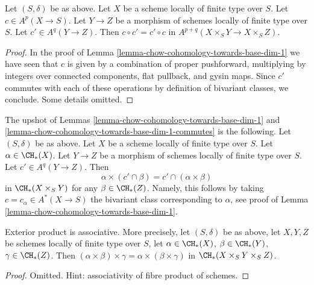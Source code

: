 \begin{lemma}
\label{lemma-chow-cohomology-towards-base-dim-1-commutes}
Let $(S, \delta)$ be as above. Let $X$ be a scheme locally of finite type
over $S$. Let $c \in A^p(X \to S)$. Let $Y \to Z$ be a morphism of schemes
locally of finite type over $S$. Let $c' \in A^q(Y \to Z)$. Then
$c \circ c' = c' \circ c$ in $A^{p + q}(X \times_S Y \to X \times_S Z)$.
\end{lemma}

\begin{proof}
In the proof of Lemma \ref{lemma-chow-cohomology-towards-base-dim-1}
we have seen that $c$ is given by a combination of
proper pushforward, multiplying by integers over connected
components, flat pullback, and gysin maps. Since $c'$ commutes with each of
these operations by definition of bivariant classes, we conclude.
Some details omitted.
\end{proof}

\begin{remark}
\label{remark-commuting-exterior-dim-1}
The upshot of Lemmas \ref{lemma-chow-cohomology-towards-base-dim-1}
and \ref{lemma-chow-cohomology-towards-base-dim-1-commutes} is the following.
Let $(S, \delta)$ be as above. Let $X$ be a scheme locally of finite type
over $S$.
Let $\alpha \in \CH_*(X)$. Let $Y \to Z$ be a morphism of schemes
locally of finite type over $S$. Let $c' \in A^q(Y \to Z)$. Then
$$
\alpha \times (c' \cap \beta) = c' \cap (\alpha \times \beta)
$$
in $\CH_*(X \times_S Y)$ for any $\beta \in \CH_*(Z)$. Namely, this
follows by taking $c = c_\alpha \in A^*(X \to S)$ the bivariant class
corresponding to $\alpha$, see proof of
Lemma \ref{lemma-chow-cohomology-towards-base-dim-1}.
\end{remark}

\begin{lemma}
\label{lemma-exterior-product-associative-dim-1}
Exterior product is associative. More precisely, let $(S, \delta)$ be
as above, let $X, Y, Z$ be schemes locally of finite type over $S$, let
$\alpha \in \CH_*(X)$, $\beta \in \CH_*(Y)$, $\gamma \in \CH_*(Z)$.
Then $(\alpha \times \beta) \times \gamma =
\alpha \times (\beta \times \gamma)$ in $\CH_*(X \times_S Y \times_S Z)$.
\end{lemma}

\begin{proof}
Omitted. Hint: associativity of fibre product of schemes.
\end{proof}















